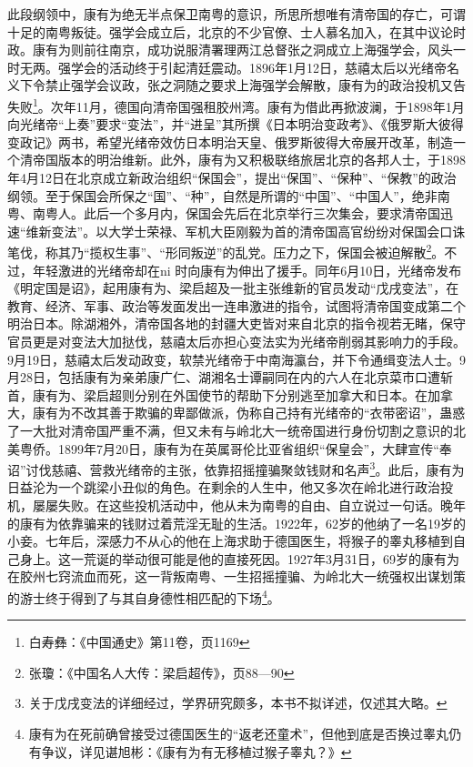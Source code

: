 此段纲领中，康有为绝无半点保卫南粤的意识，所思所想唯有清帝国的存亡，可谓十足的南粤叛徒。强学会成立后，北京的不少官僚、士人慕名加入，在其中议论时政。康有为则前往南京，成功说服清署理两江总督张之洞成立上海强学会，风头一时无两。强学会的活动终于引起清廷震动。1896年1月12日，慈禧太后以光绪帝名义下令禁止强学会议政，张之洞随之要求上海强学会解散，康有为的政治投机又告失败\footnote{白寿彝：《中国通史》第11卷，页1169}。次年11月，德国向清帝国强租胶州湾。康有为借此再掀波澜，于1898年1月向光绪帝“上奏”要求“变法”，并“进呈”其所撰《日本明治变政考》、《俄罗斯大彼得变政记》两书，希望光绪帝效仿日本明治天皇、俄罗斯彼得大帝展开改革，制造一个清帝国版本的明治维新。此外，康有为又积极联络旅居北京的各邦人士，于1898年4月12日在北京成立新政治组织“保国会”，提出“保国”、“保种”、“保教”的政治纲领。至于保国会所保之“国”、“种”，自然是所谓的“中国”、“中国人”，绝非南粤、南粤人。此后一个多月内，保国会先后在北京举行三次集会，要求清帝国迅速“维新变法”。以大学士荣禄、军机大臣刚毅为首的清帝国高官纷纷对保国会口诛笔伐，称其乃“揽权生事”、“形同叛逆”的乱党。压力之下，保国会被迫解散\footnote{张瓊：《中国名人大传：梁启超传》，页88—90}。不过，年轻激进的光绪帝却在ni 时向康有为伸出了援手。同年6月10日，光绪帝发布《明定国是诏》，起用康有为、梁启超及一批主张维新的官员发动“戊戌变法”，在教育、经济、军事、政治等发面发出一连串激进的指令，试图将清帝国变成第二个明治日本。除湖湘外，清帝国各地的封疆大吏皆对来自北京的指令视若无睹，保守官员更是对变法大加挞伐，慈禧太后亦担心变法实为光绪帝削弱其影响力的手段。9月19日，慈禧太后发动政变，软禁光绪帝于中南海瀛台，并下令通缉变法人士。9月28日，包括康有为亲弟康广仁、湖湘名士谭嗣同在内的六人在北京菜市口遭斩首，康有为、梁启超则分别在外国使节的帮助下分别逃至加拿大和日本。在加拿大，康有为不改其善于欺骗的卑鄙做派，伪称自己持有光绪帝的“衣带密诏”，蛊惑了一大批对清帝国严重不满，但又未有与岭北大一统帝国进行身份切割之意识的北美粤侨。1899年7月20日，康有为在英属哥伦比亚省组织“保皇会”，大肆宣传“奉诏”讨伐慈禧、营救光绪帝的主张，依靠招摇撞骗聚敛钱财和名声\footnote{关于戊戌变法的详细经过，学界研究颇多，本书不拟详述，仅述其大略。}。此后，康有为日益沦为一个跳梁小丑似的角色。在剩余的人生中，他又多次在岭北进行政治投机，屡屡失败。在这些投机活动中，他从未为南粤的自由、自立说过一句话。晚年的康有为依靠骗来的钱财过着荒淫无耻的生活。1922年，62岁的他纳了一名19岁的小妾。七年后，深感力不从心的他在上海求助于德国医生，将猴子的睾丸移植到自己身上。这一荒诞的举动很可能是他的直接死因。1927年3月31日，69岁的康有为在胶州七窍流血而死，这一背叛南粤、一生招摇撞骗、为岭北大一统强权出谋划策的游士终于得到了与其自身德性相匹配的下场\footnote{康有为在死前确曾接受过德国医生的“返老还童术”，但他到底是否换过睾丸仍有争议，详见谌旭彬：《康有为有无移植过猴子睾丸？》}。

